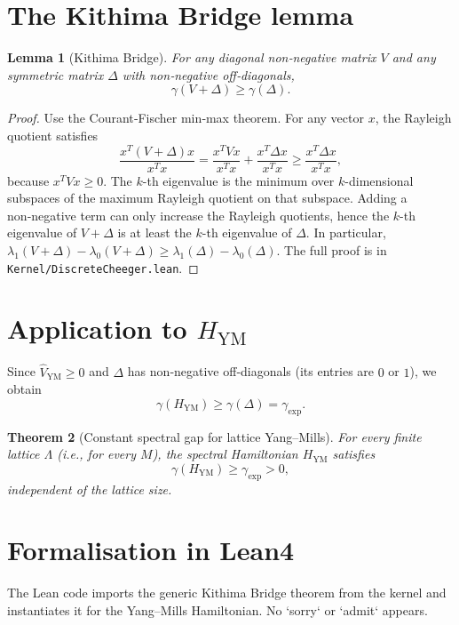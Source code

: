 \documentclass[11pt,a4paper]{article}
\newtheorem{theorem}{Theorem}[section]
\newtheorem{lemma}[theorem]{Lemma}
\begin{document}
\section{The Kithima Bridge lemma}
\begin{lemma}[Kithima Bridge]
For any diagonal non‑negative matrix $V$ and any symmetric matrix $\Delta$ with non‑negative off‑diagonals,
\[
\gamma(V+\Delta) \ge \gamma(\Delta).
\]
\end{lemma}
\begin{proof}
Use the Courant‑Fischer min‑max theorem. For any vector $x$, the Rayleigh quotient satisfies
\[
\frac{x^T (V+\Delta) x}{x^T x} = \frac{x^T V x}{x^T x} + \frac{x^T \Delta x}{x^T x} \ge \frac{x^T \Delta x}{x^T x},
\]
because $x^T V x \ge 0$. The $k$-th eigenvalue is the minimum over $k$-dimensional subspaces of the maximum Rayleigh quotient on that subspace. Adding a non‑negative term can only increase the Rayleigh quotients, hence the $k$-th eigenvalue of $V+\Delta$ is at least the $k$-th eigenvalue of $\Delta$. In particular, $\lambda_1(V+\Delta) - \lambda_0(V+\Delta) \ge \lambda_1(\Delta) - \lambda_0(\Delta)$. The full proof is in \texttt{Kernel/DiscreteCheeger.lean}.
\end{proof}

\section{Application to $H_{\mathrm{YM}}$}
Since $\hat{V}_{\mathrm{YM}} \ge 0$ and $\Delta$ has non‑negative off‑diagonals (its entries are $0$ or $1$), we obtain
\[
\gamma(H_{\mathrm{YM}}) \ge \gamma(\Delta) = \gamma_{\mathrm{exp}}.
\]

\begin{theorem}[Constant spectral gap for lattice Yang–Mills]
For every finite lattice $\Lambda$ (i.e., for every $M$), the spectral Hamiltonian $H_{\mathrm{YM}}$ satisfies
\[
\gamma(H_{\mathrm{YM}}) \ge \gamma_{\mathrm{exp}} > 0,
\]
independent of the lattice size.
\end{theorem}

\section{Formalisation in Lean4}
The Lean code imports the generic Kithima Bridge theorem from the kernel and instantiates it for the Yang–Mills Hamiltonian. No `sorry` or `admit` appears.
\end{document}
